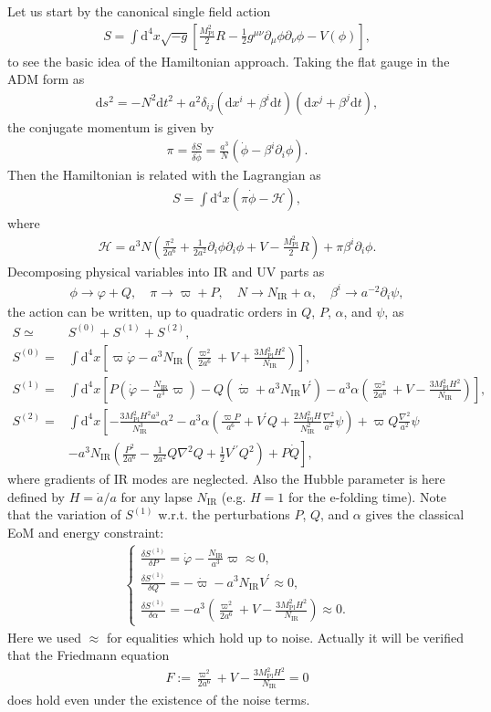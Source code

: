 \documentclass[aps, prd
, preprint
, nofootinbib 
]{revtex4-1}
\newcommand{\var}[2]{\frac{\delta #1}{\delta #2}}
\newcommand{\dd}{\mathrm{d}}
\newcommand{\Mpl}{M_\text{Pl}}
\newcommand{\IR}{\text{IR}}
\newcommand{\dps}{\displaystyle}
\newcommand{\bae}[1]{\begin{align} #1 \end{align}}
\newcommand{\bce}[1]{\begin{cases} #1 \end{cases}}
\begin{document}
Let us start by the canonical single field action
\bae{
	S=\int\dd^4x\sqrt{-g}\left[\frac{\Mpl^2}{2}R-\frac{1}{2}g^{\mu\nu}\partial_\mu\phi\partial_\nu\phi-V(\phi)\right],
}
to see the basic idea of the Hamiltonian approach.
Taking the flat gauge in the ADM form as
\bae{
	\dd s^2=-N^2\dd t^2+a^2\delta_{ij}(\dd x^i+\beta^i\dd t)(\dd x^j+\beta^j\dd t),
}
the conjugate momentum is given by
\bae{
	\pi=\var{S}{\dot{\phi}}=\frac{a^3}{N}(\dot{\phi}-\beta^i\partial_i\phi).
}
Then the Hamiltonian is related with the Lagrangian as
\bae{
	S=\int\dd^4x(\pi\dot{\phi}-\mathcal{H}),
}
where
\bae{
	\mathcal{H}=a^3N\left(\frac{\pi^2}{2a^6}+\frac{1}{2a^2}\partial_i\phi\partial_i\phi+V-\frac{\Mpl^2}{2}R\right)+\pi\beta^i\partial_i\phi.
}
Decomposing physical variables into IR and UV parts as
\bae{
	\phi\to\varphi+Q, \quad \pi\to\varpi+P, \quad N\to N_\text{IR}+\alpha, \quad \beta^i\to a^{-2}\partial_i\psi,
}
the action can be written, up to quadratic orders in $Q$, $P$, $\alpha$, and $\psi$, as
\bae{
	S\simeq& S^{(0)}+S^{(1)}+S^{(2)}, \nonumber \\
	S^{(0)}=&\int\dd^4x\left[\varpi\dot{\varphi}-a^3N_\IR\left(\frac{\varpi^2}{2a^6}+V+\frac{3\Mpl^2H^2}{N_\text{IR}}\right)\right], 
	\label{eq: S0: Hamiltonian} \\
	S^{(1)}=&\int\dd^4x\left[P\left(\dot{\varphi}-\frac{N_\IR}{a^3}\varpi\right)-Q\left(\dot{\varpi}+a^3N_\IR V^\prime\right)
	-a^3\alpha\left(\frac{\varpi^2}{2a^6}+V-\frac{3\Mpl^2H^2}{N_\IR}\right)\right], 
	\label{eq: S1: Hamiltonian} \\
	S^{(2)}=&\int\dd^4x\left[-\frac{3\Mpl^2H^2a^3}{N_\IR^3}\alpha^2-a^3\alpha\left(\frac{\varpi P}{a^6}+V^\prime Q
	+\frac{2\Mpl^2H}{N_\IR^2}\frac{\nabla^2}{a^2}\psi\right)+\varpi Q\frac{\nabla^2}{a^2}\psi\right. \nonumber \\
	&\left.-a^3N_\IR\left(\frac{P^2}{2a^6}-\frac{1}{2a^2}Q\nabla^2Q+\frac{1}{2}V^{\prime\prime}Q^2\right)+P\dot{Q}\right],
	\label{eq: S2: Hamiltonian}
}
where gradients of IR modes are neglected. Also the Hubble parameter is here defined by $H=\dot{a}/a$ for any lapse $N_\IR$ 
(e.g. $H=1$ for the e-folding time).
Note that the variation of $S^{(1)}$ w.r.t. the perturbations $P$, $Q$, and $\alpha$ gives the classical EoM and energy constraint:
\bae{\label{eq: classical EoM}
	\bce{
		\dps
		\var{S^{(1)}}{P}=\dot{\varphi}-\frac{N_\IR}{a^3}\varpi\approx0, \\[10pt]
		\dps
		\var{S^{(1)}}{Q}=-\dot{\varpi}-a^3N_\IR V^\prime\approx0, \\[10pt]
		\dps
		\var{S^{(1)}}{\alpha}=-a^3\left(\frac{\varpi^2}{2a^6}+V-\frac{3\Mpl^2H^2}{N_\IR}\right)\approx0.
	}
}
Here we used $\approx$ for equalities which hold up to noise. Actually it will be verified that the Friedmann equation 
\bae{\label{eq: Friedmann}
	F:=\frac{\varpi^2}{2a^6}+V-\frac{3\Mpl^2H^2}{N_\IR}=0
}
does hold even under the existence of the noise terms.
\end{document}
